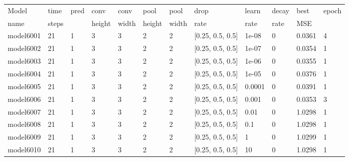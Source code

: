 \documentclass[12pt, twoside]{article}
\begin{document}
\begin{appendices}
	
	\begin{longtable}{|l|l|l|l|l|l|l|l|l|l|l|l|}
		\hline
		Model & time & pred & conv & conv   & pool & pool   & drop & learn & decay & best & epoch \\
		name & steps &     & height & width & height & width & rate & rate & rate & MSE & \\ \hline
		\endhead
		model6001 & 21 & 1 & 3 & 3 & 2 & 2 & [0.25, 0.5, 0.5] & 1e-08 & 0 & 0.0361 & 4\\ \hline
		model6002 & 21 & 1 & 3 & 3 & 2 & 2 & [0.25, 0.5, 0.5] & 1e-07 & 0 & 0.0354 & 1\\ \hline
		model6003 & 21 & 1 & 3 & 3 & 2 & 2 & [0.25, 0.5, 0.5] & 1e-06 & 0 & 0.0355 & 1\\ \hline
		model6004 & 21 & 1 & 3 & 3 & 2 & 2 & [0.25, 0.5, 0.5] & 1e-05 & 0 & 0.0376 & 1\\ \hline
		model6005 & 21 & 1 & 3 & 3 & 2 & 2 & [0.25, 0.5, 0.5] & 0.0001 & 0 & 0.0391 & 1\\ \hline
		model6006 & 21 & 1 & 3 & 3 & 2 & 2 & [0.25, 0.5, 0.5] & 0.001 & 0 & 0.0353 & 3\\ \hline
		model6007 & 21 & 1 & 3 & 3 & 2 & 2 & [0.25, 0.5, 0.5] & 0.01 & 0 & 1.0298 & 1\\ \hline
		model6008 & 21 & 1 & 3 & 3 & 2 & 2 & [0.25, 0.5, 0.5] & 0.1 & 0 & 1.0298 & 1\\ \hline
		model6009 & 21 & 1 & 3 & 3 & 2 & 2 & [0.25, 0.5, 0.5] & 1 & 0 & 1.0299 & 1\\ \hline
		model6010 & 21 & 1 & 3 & 3 & 2 & 2 & [0.25, 0.5, 0.5] & 10 & 0 & 1.0298 & 1\\ \hline
	\end{longtable}
	

\end{appendices}
\end{document}
